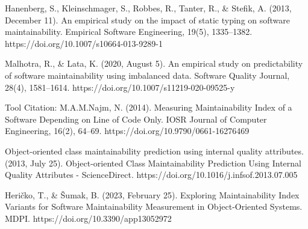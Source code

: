 \documentclass[conference]{IEEEtran}
\begin{document}
	\begin{thebibliography}{00}
		  Hanenberg, S., Kleinschmager, S., Robbes, R., Tanter, R., \& Stefik, A. (2013, December 11). An empirical study on the impact of static typing on software maintainability. Empirical Software Engineering, 19(5), 1335–1382. https://doi.org/10.1007/s10664-013-9289-1
		
		 Malhotra, R., \& Lata, K. (2020, August 5). An empirical study on predictability of software maintainability using imbalanced data. Software Quality Journal, 28(4), 1581–1614. https://doi.org/10.1007/s11219-020-09525-y
		
		 Tool Citation: M.A.M.Najm, N. (2014). Measuring Maintainability Index of a Software Depending on Line of Code Only. IOSR Journal of Computer Engineering, 16(2), 64–69. https://doi.org/10.9790/0661-16276469
		
		 Object-oriented class maintainability prediction using internal quality attributes. (2013, July 25). Object-oriented Class Maintainability Prediction Using Internal Quality Attributes - ScienceDirect. https://doi.org/10.1016/j.infsof.2013.07.005
		
		 Heričko, T., \& Šumak, B. (2023, February 25). Exploring Maintainability Index Variants for Software Maintainability Measurement in Object-Oriented Systems. MDPI. https://doi.org/10.3390/app13052972
		
	\end{thebibliography}
\end{document}
